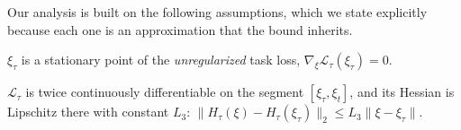 Our analysis is built on the following assumptions, which we state explicitly because
each one is an approximation that the bound inherits.

\begin{assumption}
\label{ass:stationary}
$\xi_\tau$ is a stationary point of the \emph{unregularized} task loss,
$\nabla_\xi\mathcal{L}_\tau(\xi_\tau)=0$.
\end{assumption}

\begin{assumption}
\label{ass:lipschitz}
$\mathcal{L}_\tau$ is twice continuously differentiable on the segment
$[\xi_\tau,\xi_t]$, and its Hessian is Lipschitz there with constant $L_3$:
$\|H_\tau(\xi)-H_\tau(\xi_\tau)\|_2 \le L_3\|\xi-\xi_\tau\|$.
\end{assumption}

